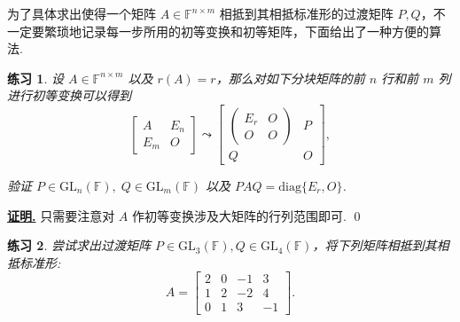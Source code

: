\documentclass[10pt,openany]{article}
\theoremstyle{thmstyle} %
\newtheorem{practice}{练习}[section]
\theoremstyle{defstyle} %
\theoremstyle{prostyle} %
\theoremstyle{exastyle}
\theoremstyle{remstyle}
\renewenvironment{proof}[1][证明]{\par\underline{\textbf{#1.}} \;\fangsong}{\qed\par}
\newcommand{\F}{\mathbb{F}}
\newcommand{\gfn}{\text{GL}_n(\mathbb{F})}
\newcommand{\gfm}{\text{GL}_m(\mathbb{F})}
\newcommand{\nm}{^{n \times m}}
\newcommand{\diag}{\mathrm{diag}}
\begin{document}
为了具体求出使得一个矩阵 \( A \in \F\nm \) 相抵到其相抵标准形的过渡矩阵 \( P,Q \)，不一定要繁琐地记录每一步所用的初等变换和初等矩阵，下面给出了一种方便的算法.

\begin{practice} \label{prac3.1}
	设 \( A \in \F\nm \) 以及 \( r(A)=r\)，那么对如下分块矩阵的前 \( n \) 行和前 \( m \) 列进行初等变换可以得到
	\[ \begin{bmatrix}
		A & E_n \\
		E_m & O
	\end{bmatrix} \leadsto \begin{bmatrix}
		\begin{pmatrix}
			E_r & O \\
			O & O
		\end{pmatrix} & P \\
		Q & O
	\end{bmatrix}, \]
	
	验证 \( P \in \gfn, \; Q \in \gfm \) 以及 \( PAQ=\diag\{E_r,O\} \). 
\end{practice}

\begin{proof}
	只需要注意对 \( A \) 作初等变换涉及大矩阵的行列范围即可.
\end{proof}

\begin{practice} \label{prac3.2}
	尝试求出过渡矩阵 \( P \in \text{GL}_3(\F) ,Q \in \text{GL}_4(\F) \)，将下列矩阵相抵到其相抵标准形:
	\[ A=\begin{bmatrix}
		2 & 0 & -1 & 3 \\
		1 & 2 & -2 & 4 \\
		0 & 1 & 3 & -1
	\end{bmatrix}. \]
\end{practice}
\end{document}
